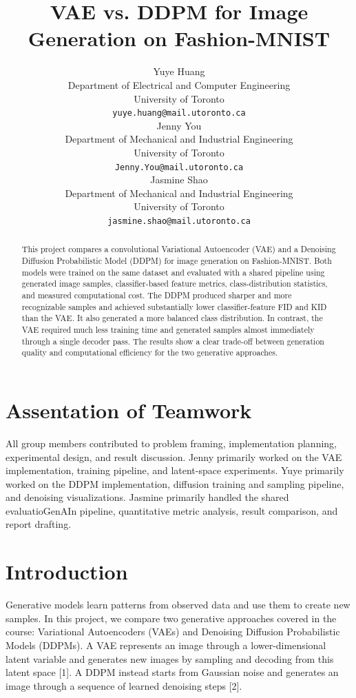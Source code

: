 \documentclass{article}
\title{VAE vs. DDPM for Image Generation on Fashion-MNIST}
\author{%
  Yuye Huang\\
  Department of Electrical and Computer Engineering\\
  University of Toronto\\
  \texttt{yuye.huang@mail.utoronto.ca} \\
  \And
  Jenny You\\
  Department of Mechanical and Industrial Engineering\\
  University of Toronto\\
  \texttt{Jenny.You@mail.utoronto.ca} \\
  \And
  Jasmine Shao\\
  Department of Mechanical and Industrial Engineering\\
  University of Toronto\\
  \texttt{jasmine.shao@mail.utoronto.ca} \\
}
\begin{document}
\maketitle

\begin{abstract}
This project compares a convolutional Variational Autoencoder (VAE) and a Denoising Diffusion Probabilistic Model (DDPM) for image generation on Fashion-MNIST. Both models were trained on the same dataset and evaluated with a shared pipeline using generated image samples, classifier-based feature metrics, class-distribution statistics, and measured computational cost. The DDPM produced sharper and more recognizable samples and achieved substantially lower classifier-feature FID and KID than the VAE. It also generated a more balanced class distribution. In contrast, the VAE required much less training time and generated samples almost immediately through a single decoder pass. The results show a clear trade-off between generation quality and computational efficiency for the two generative approaches.
\end{abstract}

\section*{Assentation of Teamwork}
All group members contributed to problem framing, implementation planning, experimental design, and result discussion. Jenny primarily worked on the VAE implementation, training pipeline, and latent-space experiments. Yuye primarily worked on the DDPM implementation, diffusion training and sampling pipeline, and denoising visualizations. Jasmine primarily handled the shared evaluatioGenAIn pipeline, quantitative metric analysis, result comparison, and report drafting.

\section{Introduction}
Generative models learn patterns from observed data and use them to create new samples. In this project, we compare two generative approaches covered in the course: Variational Autoencoders (VAEs) and Denoising Diffusion Probabilistic Models (DDPMs). A VAE represents an image through a lower-dimensional latent variable and generates new images by sampling and decoding from this latent space [1]. A DDPM instead starts from Gaussian noise and generates an image through a sequence of learned denoising steps [2].
\end{document}

